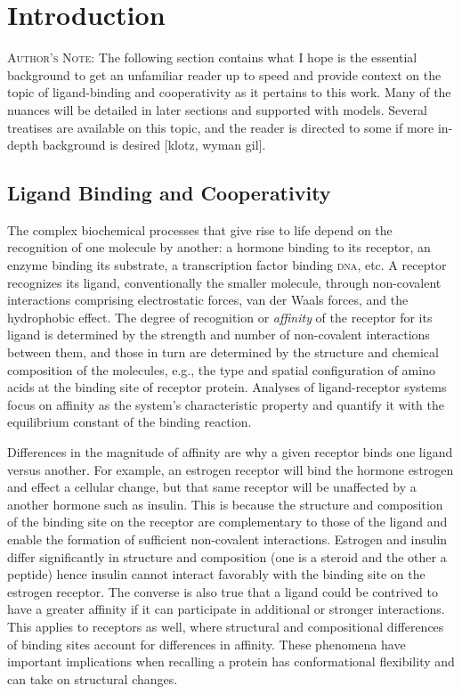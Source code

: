 \documentclass{article}
\numberwithin{equation}{section}
\begin{document}
\renewcommand{\thefootnote}{\fnsymbol{footnote}}

\section{Introduction}

\textsc{Author's Note}: The following section contains what I hope is the essential background to get an unfamiliar reader up to speed and provide context on the topic of ligand-binding and cooperativity as it pertains to this work. Many of the nuances will be detailed in later sections and supported with models. Several treatises are available on this topic, and the reader is directed to some if more in-depth background is desired [klotz, wyman gil].

\subsection*{Ligand Binding and Cooperativity}

The complex biochemical processes that give rise to life depend on the recognition of one molecule by another: a hormone binding to its receptor, an enzyme binding its substrate, a transcription factor binding \textsc{dna}, etc. A receptor recognizes its ligand, conventionally the smaller molecule, through non-covalent interactions comprising electrostatic forces, van der Waals forces, and the hydrophobic effect. The degree of recognition or \emph{affinity} of the receptor for its ligand is determined by the strength and number of non-covalent interactions between them, and those in turn are determined by the structure and chemical composition of the molecules, e.g., the type and spatial configuration of amino acids at the binding site of receptor protein. Analyses of ligand-receptor systems focus on affinity as the system's characteristic property and quantify it with the equilibrium constant of the binding reaction.


Differences in the magnitude of affinity are why a given receptor binds one ligand versus another. For example, an estrogen receptor will bind the hormone estrogen and effect a cellular change, but that same receptor will be unaffected by a another hormone such as insulin. This is because the structure and composition of the binding site on the receptor are complementary to those of the ligand and enable the formation of sufficient non-covalent interactions. Estrogen and insulin differ significantly in structure and composition (one is a steroid and the other a peptide) hence insulin cannot interact favorably with the binding site on the estrogen receptor. The converse is also true that a ligand could be contrived to have a greater affinity if it can participate in additional or stronger interactions. This applies to receptors as well, where structural and compositional differences of binding sites account for differences in affinity. These phenomena have important implications when recalling a protein has conformational flexibility and can take on structural changes.
\end{document}
